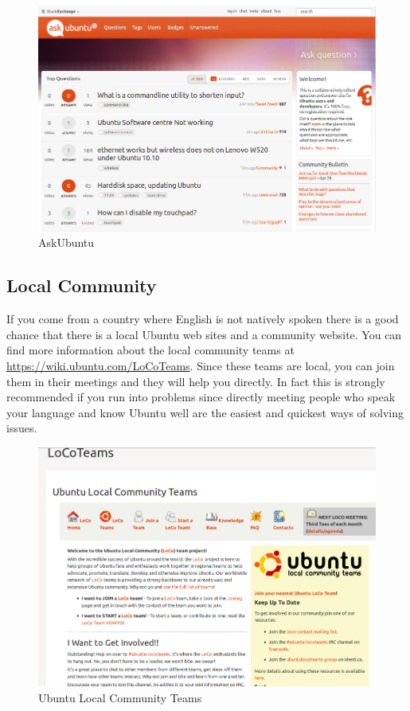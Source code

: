 \begin{figure}[h!]	
	\centering
	\includegraphics[width=350pt]{./images/get-help/askubuntu.png}
	\caption{AskUbuntu}	
	\label{fig:askubuntu}		
\end{figure}

\subsection*{Local Community} 
If you come from a country where English is not natively spoken there is a good chance that there is a  local Ubuntu web sites and a community website. You can find more information about the local community teams at \href{https://wiki.ubuntu.com/LoCoTeams}{https://wiki.ubuntu.com/LoCoTeams}. Since these teams are local, you can join them in their meetings and they will help you directly. In fact this is strongly recommended if you run into problems since directly meeting people who speak your language and know Ubuntu well are the easiest and quickest ways of solving issues.

\begin{figure}[h!]	
	\centering
	\includegraphics[width=350pt]{./images/get-help/locoteams.png}
	\caption{Ubuntu Local Community Teams}	
	\label{fig:locoteams}		
\end{figure}

